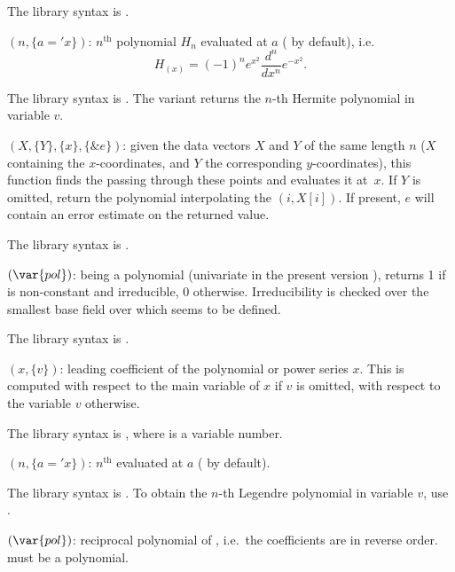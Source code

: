 The library syntax is .

$(n,\{a='x\})$: \label{se:polhermite}$n^{\text{th}}$  polynomial $H_n$ evaluated at $a$
( by default), i.e.
$$ H_(x) = (-1)^n e^{x^2} \dfrac{d^n}{dx^n}e^{-x^2}.$$

The library syntax is .
The variant  returns the $n$-th
Hermite polynomial in variable $v$.

$(X,\{Y\},\{x\},\{\&e\})$: \label{se:polinterpolate}given the data vectors
$X$ and $Y$ of the same length $n$ ($X$ containing the $x$-coordinates,
and $Y$ the corresponding $y$-coordinates), this function finds the
 passing through these points and evaluates it
at~$x$. If $Y$ is omitted, return the polynomial interpolating the
$(i,X[i])$. If present, $e$ will contain an error estimate on the returned
value.

The library syntax is .

$(\var{pol})$: \label{se:polisirreducible} being a polynomial (univariate in the present version \vers),
returns 1 if  is non-constant and irreducible, 0 otherwise.
Irreducibility is checked over the smallest base field over which 
seems to be defined.

The library syntax is .

$(x,\{v\})$: \label{se:pollead}leading coefficient of the polynomial or power series $x$. This is
 computed with respect to the main variable of $x$ if $v$ is omitted, with
 respect to the variable $v$ otherwise.

The library syntax is , where  is a variable number.

$(n,\{a='x\})$: \label{se:pollegendre}$n^{\text{th}}$  evaluated at $a$ ( by
default).

The library syntax is .
To obtain the $n$-th Legendre polynomial in variable $v$,
use .

$(\var{pol})$: \label{se:polrecip}reciprocal polynomial of , i.e.~the coefficients are in
reverse order.  must be a polynomial.

